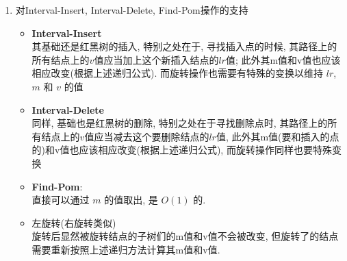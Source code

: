 \documentclass[UTF8]{article}
\begin{document}
\begin{enumerate}[(a). ]
\begin{enumerate}[(1). ]
		\item 对{\sc Interval-Insert}, {\sc Interval-Delete}, {\sc Find-Pom}操作的支持
		\begin{itemize}
			\item \textbf{{\sc Interval-Insert}}\\
			其基础还是红黑树的插入, 特别之处在于, 寻找插入点的时候, 其路径上的所有结点上的$v$值应当加上这个新插入结点的$lr$值; 此外其m值和v值也应该相应改变(根据上述递归公式). 而旋转操作也需要有特殊的变换以维持 $lr$, $m$ 和 $v$ 的值
			\item \textbf{{\sc Interval-Delete}}\\
			同样, 基础也是红黑树的删除, 特别之处在于寻找删除点时, 其路径上的所有结点上的$v$值应当减去这个要删除结点的$lr$值, 此外其m值(要和插入的点的)和v值也应该相应改变(根据上述递归公式), 而旋转操作同样也要特殊变换
			\item \textbf{{\sc Find-Pom}}:\\
			直接可以通过 $m$ 的值取出, 是 $O(1)$ 的.
			\item 左旋转(右旋转类似)\\
			旋转后显然被旋转结点的子树们的m值和v值不会被改变, 但旋转了的结点需要重新按照上述递归方法计算其m值和v值.
		\end{itemize}
	\end{enumerate}
\end{enumerate}

\newpage
\end{document}
